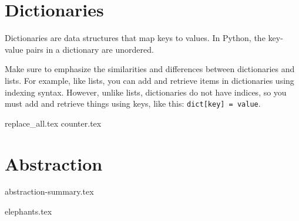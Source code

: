 \documentclass{exam}
\begin{document}
\newpage
\section{Dictionaries}
Dictionaries are data structures that map keys to values. In Python, the key-value pairs in a dictionary are unordered.
\begin{guide}
\newline
Make sure to emphasize the similarities and differences between dictionaries and lists. For example, like lists, you can 
add and retrieve items in dictionaries using indexing syntax. However, unlike lists, dictionaries do not have 
indices, so you must add and retrieve things using keys, like this: \texttt{dict[key] = value}.
\end{guide}
\begin{questions}
{replace_all.tex}
\newpage
{counter.tex}
\end{questions}

\newpage
\section{Abstraction}
{abstraction-summary.tex}
\begin{questions}
{elephants.tex}
\end{questions}
\end{document}
